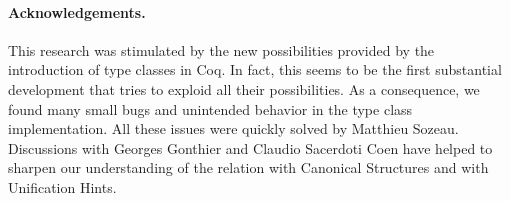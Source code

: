 \documentclass[a4paper,10pt, runningheads]{llncs}
\begin{document}
\paragraph{Acknowledgements.}
This research was stimulated by the new possibilities provided by the introduction of type classes
in Coq. In fact, this seems to be the first substantial development that tries to exploid all their
possibilities. As a consequence, we found many small bugs and unintended behavior in the type
class implementation. All these issues were quickly solved by Matthieu Sozeau. Discussions with
Georges Gonthier and Claudio Sacerdoti Coen have helped to
sharpen our understanding of the relation with Canonical Structures and with Unification Hints.


\end{document}
